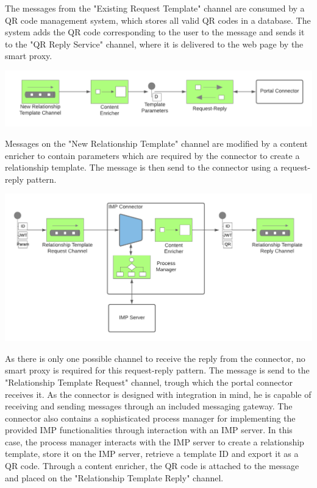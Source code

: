 \documentclass[
     12pt,         %
     a4paper,      %
     BCOR=10mm,version=first,     %
     DIV=14,version=first,        %
     ]{scrreprt}
\begin{document}
The messages from the "Existing Request Template" channel are consumed by a QR code management system, which stores all valid QR codes in a database. The system adds the QR code corresponding to the user to the message and sends it to the "QR Reply Service" channel, where it is delivered to the web page by the smart proxy.

\begin{center}
    \includegraphics[width=15cm]{Diagrams/Integration 1/Connection/Messaging 5.png}
\end{center}

Messages on the "New Relationship Template" channel are modified by a content enricher to contain parameters which are required by the connector to create a relationship template. The message is then send to the connector using a request-reply pattern.

\begin{center}
    \includegraphics[width=15cm]{Diagrams/Integration 1/Connection/Messaging 6.png}
\end{center}

As there is only one possible channel to receive the reply from the connector, no smart proxy is required for this request-reply pattern. The message is send to the "Relationship Template Request" channel, trough which the portal connector receives it. As the connector is designed with integration in mind, he is capable of receiving and sending messages through an included messaging gateway. The connector also contains a sophisticated process manager for implementing the provided IMP functionalities through interaction with an IMP server. In this case, the process manager interacts with the IMP server to create a relationship template, store it on the IMP server, retrieve a template ID and export it as a QR code. Through a content enricher, the QR code is attached to the message and placed on the "Relationship Template Reply" channel.
\end{document}

